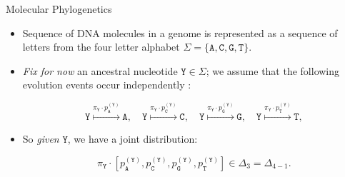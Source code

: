 \begin{frame}{Molecular Phylogenetics}

    \begin{itemize}
        \item Sequence of DNA molecules in a genome is represented as a sequence of letters from the four letter alphabet $\Sigma = \{ \texttt{A}, \texttt{C}, \texttt{G}, \texttt{T} \}$.

        \item \emph{Fix for now} an ancestral nucleotide $\texttt{Y} \in \Sigma$; we assume that the following evolution events occur independently \cite{EAsalmon}:

        $$ \texttt{Y} \overset{ \pi_{\texttt{Y}} \cdot p_{\texttt{A}}^{(\texttt{Y})}  }{\longmapsto}  \texttt{A}, \quad \texttt{Y} \overset{ \pi_{\texttt{Y}} \cdot p_{\texttt{C}}^{(\texttt{Y})}  }{\longmapsto} \texttt{C}, \quad \texttt{Y} \overset{ \pi_{\texttt{Y}} \cdot p_{\texttt{G}}^{(\texttt{Y})}  }{\longmapsto} \texttt{G}, \quad \texttt{Y} \overset{ \pi_{\texttt{Y}} \cdot p_{\texttt{T}}^{(\texttt{Y})}  }{\longmapsto} \texttt{T}, $$ 

        \item So \emph{given} $\texttt{Y}$, we have a joint distribution:
        
        $$ \pi_{\texttt{Y}} \cdot [ p_{\texttt{A}}^{(\texttt{Y})}, p_{\texttt{C}}^{(\texttt{Y})}, p_{\texttt{G}}^{(\texttt{Y})}, p_{\texttt{T}}^{(\texttt{Y})} ] \in \Delta_{3} = \Delta_{4-1}. $$

    \end{itemize}

\end{frame}

